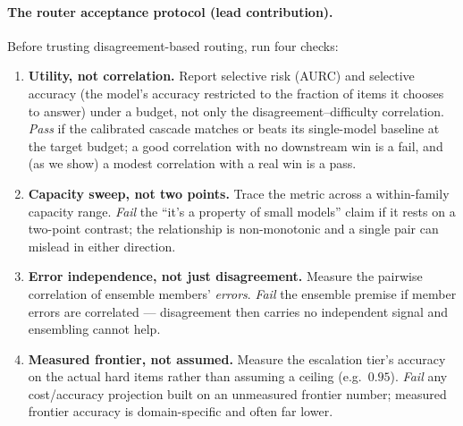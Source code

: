 \documentclass[letterpaper]{article} %
\begin{document}
\paragraph{The router acceptance protocol (lead contribution).}
Before trusting disagreement-based routing, run four checks:
\begin{enumerate}\itemsep2pt
\item[\textbf{A1}] \textbf{Utility, not correlation.} Report selective risk
(AURC) and selective accuracy (the model's accuracy restricted to the fraction of items it chooses to answer) under a budget, not only the
disagreement--difficulty correlation. \emph{Pass} if the calibrated cascade
matches or beats its single-model baseline at the target budget; a good
correlation with no downstream win is a fail, and (as we show) a modest
correlation with a real win is a pass.
\item[\textbf{A2}] \textbf{Capacity sweep, not two points.} Trace the metric
across a within-family capacity range. \emph{Fail} the ``it's a property of
small models'' claim if it rests on a two-point contrast; the relationship is
non-monotonic and a single pair can mislead in either direction.
\item[\textbf{A3}] \textbf{Error independence, not just disagreement.} Measure
the pairwise correlation of ensemble members' \emph{errors}. \emph{Fail} the
ensemble premise if member errors are correlated --- disagreement then carries no
independent signal and ensembling cannot help.
\item[\textbf{A4}] \textbf{Measured frontier, not assumed.} Measure the escalation
tier's accuracy on the actual hard items rather than assuming a ceiling (e.g.\
$0.95$). \emph{Fail} any cost/accuracy projection built on an unmeasured frontier
number; measured frontier accuracy is domain-specific and often far lower.
\end{enumerate}
\end{document}
